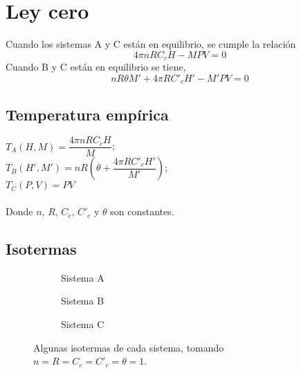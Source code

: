 \documentclass[12pt]{article}
\begin{document}
\maketitle

\section{Ley cero}
Cuando los sistemas A y C están en equilibrio, se cumple la relación
\begin{equation}
4\pi nRC_{c}H-MPV=0  
\end{equation}
Cuando B y C están en equilibrio se tiene,
\begin{equation}
nR\theta M'+4\pi RC'_{c}H'-M'PV=0
\end{equation}
\subsection{Temperatura empírica}
\begin{center}
  $T_A(H,M)=\dfrac{4\pi nRC_cH}{M}$; \\ 
  $T_B(H',M')=nR(\theta+\dfrac{4\pi RC'_cH'}{M'})$;  \\
  $T_C(P,V)=PV$
\end{center}
\paragraph{}
Donde $n$, $R$, $C_c$, $C'_c $ y $\theta$ son constantes.
\subsection{Isotermas}

\begin{figure}[H]
  \centering
  \begin{subfigure}[b]{0.3\textwidth}
    \scalebox{.4}{}
    \caption{Sistema A}
  \end{subfigure}
  \begin{subfigure}[b]{0.3\textwidth}
    \scalebox{.4}{}
    \caption{Sistema B}
  \end{subfigure}
  \begin{subfigure}[b]{0.3\textwidth}
    \scalebox{.4}{}
    \caption{Sistema C}
  \end{subfigure}
  \caption{Algunas isotermas de cada sistema, tomando $n=R=C_c=C'_c=\theta =1$.}
\end{figure}
      
\end{document}
